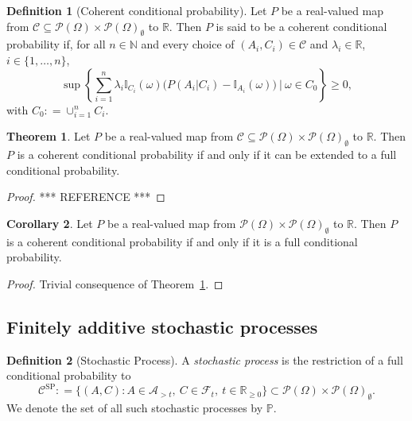 \documentclass[10pt]{paper}
\theoremstyle{definition}
\newtheorem{theorem}{Theorem}
\newtheorem{corollary}[theorem]{Corollary}
\newtheorem{definition}{Definition}
\newcommand{\reals}{\mathbb{R}}
\newcommand{\realsnonneg}{\reals_{\geq 0}}
\newcommand{\paths}{\Omega}
\newcommand{\power}{\mathcal{P}(\paths)}
\newcommand{\nonemptypower}{\power_{\emptyset}}
\newcommand{\filter}[1][t]{\mathcal{F}_{#1}}
\newcommand{\processes}{\mathbb{P}}
\newcommand{\ind}[1]{\mathbb{I}_{#1}}
\newcommand{\coloneqq}{:\!=}
\begin{document}
\begin{definition}[Coherent conditional probability]\label{def:coherence}
Let $P$ be a real-valued map from $\mathcal{C}\subseteq\power\times\nonemptypower$ to $\reals$. Then $P$ is said to be a coherent conditional probability if, for all $n\in\mathbb{N}$ and every choice of $(A_i,C_i)\in\mathcal{C}$ and $\lambda_i\in\reals$, $i\in\{1,\dots,n\}$,
\begin{equation*}
\sup\left\{\sum_{i=1}^n\lambda_i\ind{C_i}(\omega)\bigl(P(A_i\vert C_i)-\ind{A_i}(\omega)\bigr)~\Bigg\vert~\omega\in C_0\right\}\geq0,
\end{equation*}
with $C_0\coloneqq\cup_{i=1}^nC_i$.
\end{definition}

\begin{theorem}\label{theo:coherentextendable}
Let $P$ be a real-valued map from $\mathcal{C}\subseteq\power\times\nonemptypower$ to $\reals$. Then $P$ is a coherent conditional probability if and only if it can be extended to a full conditional probability.
\end{theorem}
\begin{proof}
*** REFERENCE ***
\end{proof}

\begin{corollary}
Let $P$ be a real-valued map from $\power\times\nonemptypower$ to $\reals$. Then $P$ is a coherent conditional probability if and only if it is a full conditional probability.
\end{corollary}
\begin{proof}
Trivial consequence of Theorem~\ref{theo:coherentextendable}.
\end{proof}

\subsection{Finitely additive stochastic processes}


\begin{definition}[Stochastic Process]\label{def:stoch_process}
A \emph{stochastic process} is the restriction of a full conditional probability to
\begin{equation*}
\mathcal{C}^\mathrm{SP}\coloneqq\big\{
(A,C)
\colon
A\in\mathcal{A}_{> t},~C\in\filter,~t\in\realsnonneg\big\}\subset\power\times\nonemptypower.
\end{equation*}
We denote the set of all such stochastic processes by $\processes$.
\end{definition}
\end{document}
